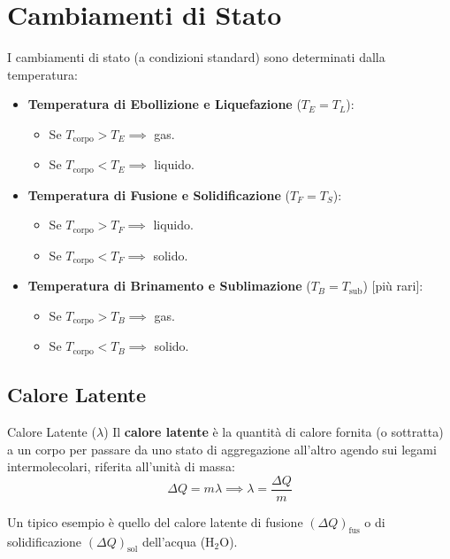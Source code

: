 \section{Cambiamenti di Stato}
I cambiamenti di stato (a condizioni standard) sono determinati dalla temperatura:
\begin{itemize}
    \item \textbf{Temperatura di Ebollizione e Liquefazione} ($T_E = T_L$):
    \begin{itemize}
        \item Se $T_{\text{corpo}} > T_E \implies$ gas.
        \item Se $T_{\text{corpo}} < T_E \implies$ liquido.
    \end{itemize}
    \item \textbf{Temperatura di Fusione e Solidificazione} ($T_F = T_S$):
    \begin{itemize}
        \item Se $T_{\text{corpo}} > T_F \implies$ liquido.
        \item Se $T_{\text{corpo}} < T_F \implies$ solido.
    \end{itemize}
    \item \textbf{Temperatura di Brinamento e Sublimazione} ($T_B = T_{\text{sub}}$) [più rari]:
    \begin{itemize}
        \item Se $T_{\text{corpo}} > T_B \implies$ gas.
        \item Se $T_{\text{corpo}} < T_B \implies$ solido.
    \end{itemize}
\end{itemize}

\subsection{Calore Latente}

\begin{definizione}{Calore Latente ($\lambda$)}
Il \textbf{calore latente} è la quantità di calore fornita (o sottratta) a un corpo per passare da uno stato di aggregazione all'altro agendo sui legami intermolecolari, riferita all'unità di massa:
\begin{equation}
    \boxed{ \Delta Q = m \lambda \implies \lambda = \frac{\Delta Q}{m} }
\end{equation}
\end{definizione}

Un tipico esempio è quello del calore latente di fusione $(\Delta Q)_{\text{fus}}$ o di solidificazione $(\Delta Q)_{\text{sol}}$ dell'acqua ($\mathrm{H_2O}$).

